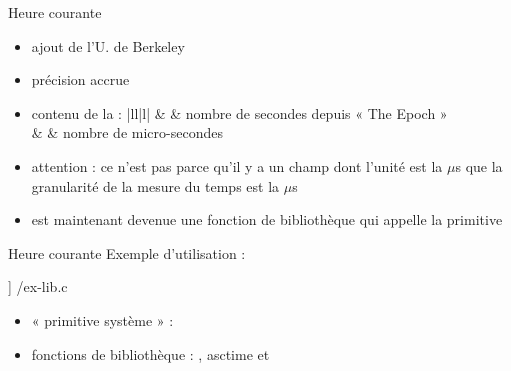 \begin {frame} {Heure courante}

    \begin {itemize}
	\item ajout de l'U. de Berkeley
	\item précision accrue
	\item contenu de la  :
	    \ctableau {\fD} {|ll|l|} {
		\rc {} & 
		    & nombre de secondes depuis « The Epoch » \\
		\rc {}  & 
		    & nombre de micro-secondes \\
	    }

	    \vspace* {1mm}

	\item attention : ce n'est pas parce qu'il y a un champ dont
	    l'unité est la $\mu$s que la granularité de la mesure
	    du temps est la $\mu$s

	\item {} est maintenant devenue une fonction de
	    bibliothèque qui appelle la primitive 

    \end {itemize}
\end {frame}

\begin {frame} {Heure courante}
    Exemple d'utilisation :

    \fD\lstmonstyle] {\inc/ex-lib.c}

    \begin {itemize}
	\item « primitive système » : 
	\item fonctions de bibliothèque : , \code
	    {asctime} et 
    \end {itemize}
\end {frame}



